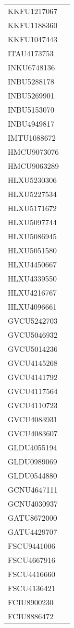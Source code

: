 \documentclass[a4paper]{report}
\begin{document}
\begin{longtable}{| p{4cm} | p{10cm} |}
	KKFU1217067  &  \\
	KKFU1188360  &  \\
	KKFU1047443  &  \\
	ITAU4173753  &  \\
	INKU6748136  &  \\
	INBU5288178  &  \\
	INBU5269901  &  \\
	INBU5153070  &  \\
	INBU4949817  &  \\
	IMTU1088672  &  \\
	HMCU9073076  &  \\
	HMCU9063289  &  \\
	HLXU5230306  &  \\
	HLXU5227534  &  \\
	HLXU5171672  &  \\
	HLXU5097744  &  \\
	HLXU5086945  &  \\
	HLXU5051580  &  \\
	HLXU4450667  &  \\
	HLXU4339550  &  \\
	HLXU4216767  &  \\
	HLXU4096661  &  \\
	GVCU5242703  &  \\
	GVCU5046932  &  \\
	GVCU5014236  &  \\
	GVCU4145268  &  \\
	GVCU4141792  &  \\
	GVCU4117564  &  \\
	GVCU4110723  &  \\
	GVCU4083931  &  \\
	GVCU4083607  &  \\
	GLDU4055194  &  \\
	GLDU0989069  &  \\
	GLDU0544880  &  \\
	GCNU4647111  &  \\
	GCNU4030937  &  \\
	GATU8672000  &  \\
	GATU4429707  &  \\
	FSCU9441006  &  \\
	FSCU4667916  &  \\
	FSCU4416660  &  \\
	FSCU4136421  &  \\
	FCIU8900230  &  \\
	FCIU8886472  &  \\

\end{longtable}
\end{document}
